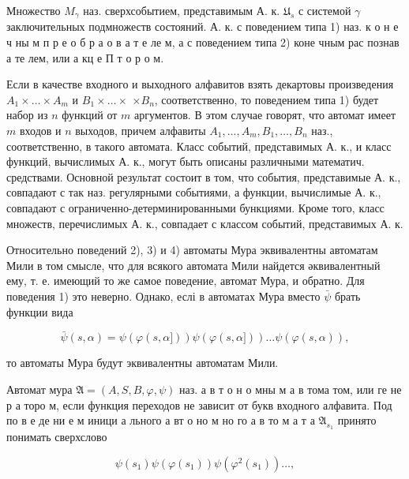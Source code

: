 \documentclass[10pt]{article}
\begin{document}
Множество $M_{\gamma}$ наз. сверхсобытием, представимым А. к. $\mathfrak{U}_{s}$ с системой $\gamma$ заключительных подмножеств состояний. А. к. с поведением типа 1) наз. к о н е ч ны м п р е о б р а о в а т е ле м, а с поведением типа 2) коне чным рас познав а те лем, или а кц е П т о р о м.



Если в качестве входного и выходного алфавитов взять декартовы произведения $A_{1} \times \ldots \times A_{m}$ и $B_{1} \times \ldots \times$ $\times B_{n}$, соответственно, то поведением типа 1) будет набор из $n$ функций от $m$ аргументов. В этом случае говорят, что автомат имеет $m$ входов и $n$ выходов, причем алфавиты $A_{1}, \ldots, A_{m}, B_{1}, \ldots, B_{n}$ наз., соответственно, в такого автомата. Класс событий, представимых А. к., и класс функций, вычислимых А. к., могут быть описаны различными математич. средствами. Основной результат состоит в том, что события, представимые А. к., совпадают с так наз. регулярными событиями, а функции, вычислимые А. к., совпадают с ограниченно-детерминированными бункциями. Кроме того, класс множеств, перечислимых А. к., совпадает с классом событий, представимых А. к.



Относительно поведений 2), 3) и 4) автоматы Мура эквивалентны автоматам Мили в том смысле, что для всякого автомата Мили найдется әквивалентный ему, т. е. имеющий то же самое поведение, автомат Мура, и обратно. Для поведения 1) это неверно. Однако, еслі в автоматах Мура вместо $\bar{\psi}$ брать функции вида



\[

\bar{\psi}(s, \alpha)=\psi(\varphi(s, \alpha])) \psi(\varphi(s, \alpha])) \ldots \psi(\varphi(s, \alpha)),

\]



то автоматы Мура будут эквивалентны автоматам Мили.



Автомат мура $\mathfrak{A}=(A, S, B, \varphi, \psi)$ наз. а в т о н о мны м а в тома том, или ге не р а торо м, если функция переходов не зависит от букв входного алфавита. Под по в е де ни е м иници а льного а вт о но м но го а в то м а т а $\mathfrak{A}_{s_{1}}$ принято понимать сверхслово



\[

\psi\left(s_{1}\right) \psi\left(\varphi\left(s_{1}\right)\right) \psi\left(\varphi^{2}\left(s_{1}\right)\right) \ldots,

\]
\end{document}
